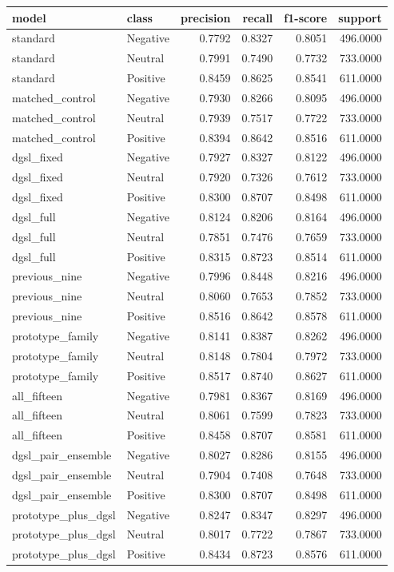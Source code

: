 \begin{tabular}{llrrrr}
\toprule
model & class & precision & recall & f1-score & support \\
\midrule
standard & Negative & 0.7792 & 0.8327 & 0.8051 & 496.0000 \\
standard & Neutral & 0.7991 & 0.7490 & 0.7732 & 733.0000 \\
standard & Positive & 0.8459 & 0.8625 & 0.8541 & 611.0000 \\
matched\_control & Negative & 0.7930 & 0.8266 & 0.8095 & 496.0000 \\
matched\_control & Neutral & 0.7939 & 0.7517 & 0.7722 & 733.0000 \\
matched\_control & Positive & 0.8394 & 0.8642 & 0.8516 & 611.0000 \\
dgsl\_fixed & Negative & 0.7927 & 0.8327 & 0.8122 & 496.0000 \\
dgsl\_fixed & Neutral & 0.7920 & 0.7326 & 0.7612 & 733.0000 \\
dgsl\_fixed & Positive & 0.8300 & 0.8707 & 0.8498 & 611.0000 \\
dgsl\_full & Negative & 0.8124 & 0.8206 & 0.8164 & 496.0000 \\
dgsl\_full & Neutral & 0.7851 & 0.7476 & 0.7659 & 733.0000 \\
dgsl\_full & Positive & 0.8315 & 0.8723 & 0.8514 & 611.0000 \\
previous\_nine & Negative & 0.7996 & 0.8448 & 0.8216 & 496.0000 \\
previous\_nine & Neutral & 0.8060 & 0.7653 & 0.7852 & 733.0000 \\
previous\_nine & Positive & 0.8516 & 0.8642 & 0.8578 & 611.0000 \\
prototype\_family & Negative & 0.8141 & 0.8387 & 0.8262 & 496.0000 \\
prototype\_family & Neutral & 0.8148 & 0.7804 & 0.7972 & 733.0000 \\
prototype\_family & Positive & 0.8517 & 0.8740 & 0.8627 & 611.0000 \\
all\_fifteen & Negative & 0.7981 & 0.8367 & 0.8169 & 496.0000 \\
all\_fifteen & Neutral & 0.8061 & 0.7599 & 0.7823 & 733.0000 \\
all\_fifteen & Positive & 0.8458 & 0.8707 & 0.8581 & 611.0000 \\
dgsl\_pair\_ensemble & Negative & 0.8027 & 0.8286 & 0.8155 & 496.0000 \\
dgsl\_pair\_ensemble & Neutral & 0.7904 & 0.7408 & 0.7648 & 733.0000 \\
dgsl\_pair\_ensemble & Positive & 0.8300 & 0.8707 & 0.8498 & 611.0000 \\
prototype\_plus\_dgsl & Negative & 0.8247 & 0.8347 & 0.8297 & 496.0000 \\
prototype\_plus\_dgsl & Neutral & 0.8017 & 0.7722 & 0.7867 & 733.0000 \\
prototype\_plus\_dgsl & Positive & 0.8434 & 0.8723 & 0.8576 & 611.0000 \\
\bottomrule
\end{tabular}

